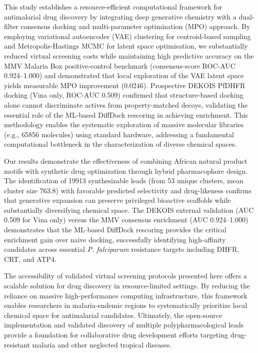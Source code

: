 \documentclass[journal=jcisd8,manuscript=article]{achemso}
\begin{document}
This study establishes a resource-efficient computational framework for antimalarial drug discovery by integrating deep generative chemistry with a dual-filter consensus docking and multi-parameter optimization (MPO) approach. By employing variational autoencoder (VAE) clustering for centroid-based sampling and Metropolis-Hastings MCMC for latent space optimisation, we substantially reduced virtual screening costs while maintaining high predictive accuracy on the MMV Malaria Box positive-control benchmark (consensus-score ROC-AUC \numrange{0.924}{1.000}) and demonstrated that local exploration of the VAE latent space yields measurable MPO improvement (\num{+0.0246}). Prospective DEKOIS PfDHFR docking (Vina only, ROC-AUC \num{0.509}) confirmed that structure-based docking alone cannot discriminate actives from property-matched decoys, validating the essential role of the ML-based DiffDock rescoring in achieving enrichment. This methodology enables the systematic exploration of massive molecular libraries (e.g., \num{65856} molecules) using standard hardware, addressing a fundamental computational bottleneck in the characterization of diverse chemical spaces.

Our results demonstrate the effectiveness of combining African natural product motifs with synthetic drug optimization through hybrid pharmacophore design. The identification of \num{19913} synthesizable leads (from \num{53} unique clusters, mean cluster size \num{763.8}) with favorable predicted selectivity and drug-likeness confirms that generative expansion can preserve privileged bioactive scaffolds while substantially diversifying chemical space. The DEKOIS external validation (AUC \num{0.509} for Vina only) versus the MMV consensus enrichment (AUC \numrange{0.924}{1.000}) demonstrates that the ML-based DiffDock rescoring provides the critical enrichment gain over naive docking, successfully identifying high-affinity candidates across essential \textit{P. falciparum} resistance targets including DHFR, CRT, and ATP4.

The accessibility of validated virtual screening protocols presented here offers a scalable solution for drug discovery in resource-limited settings. By reducing the reliance on massive high-performance computing infrastructure, this framework enables researchers in malaria-endemic regions to systematically prioritize local chemical space for antimalarial candidates. Ultimately, the open-source implementation and validated discovery of multiple polypharmacological leads provide a foundation for collaborative drug development efforts targeting drug-resistant malaria and other neglected tropical diseases.
\end{document}
